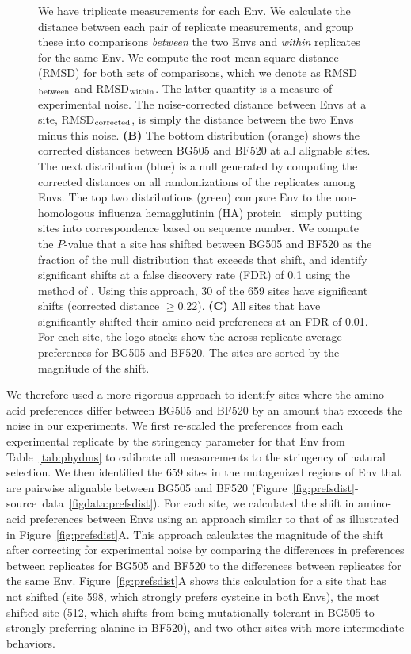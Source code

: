\documentclass[9pt]{elife}
\begin{document}
\begin{figure}
\begin{fullwidth}
{We have triplicate measurements for each Env.
We calculate the distance between each pair of replicate measurements, and group these into comparisons \emph{between} the two Envs and \emph{within} replicates for the same Env.
We compute the root-mean-square distance (RMSD) for both sets of comparisons, which we denote as RMSD$_{\rm{between}}$ and RMSD$_{\rm{within}}$.
The latter quantity is a measure of experimental noise.
The noise-corrected distance between Envs at a site, RMSD$_{\rm{corrected}}$, is simply the distance between the two Envs minus this noise.
{\bf (B)} The bottom distribution (orange) shows the corrected distances between BG505 and BF520 at all alignable sites.
The next distribution (blue) is a null generated by computing the corrected distances on all randomizations of the replicates among Envs.
The top two distributions (green) compare Env to the non-homologous influenza hemagglutinin (HA) protein~\citep{doud2016accurate} simply putting sites into correspondence based on sequence number.
We compute the $P$-value that a site has shifted between BG505 and BF520 as the fraction of the null distribution that exceeds that shift, and identify significant shifts at a false discovery rate (FDR) of 0.1 using the method of \citet{benjamini1995controlling}.
Using this approach, 30 of the 659 sites have significant shifts (corrected distance $\ge$0.22).
{\bf (C)} All sites that have significantly shifted their amino-acid preferences at an FDR of 0.01.
For each site, the logo stacks show the across-replicate average preferences for BG505 and BF520.
The sites are sorted by the magnitude of the shift.
}
\end{fullwidth}
\end{figure}

We therefore used a more rigorous approach to identify sites where the amino-acid preferences differ between BG505 and BF520 by an amount that exceeds the noise in our experiments.
We first re-scaled the preferences from each experimental replicate by the stringency parameter for that Env from Table~\ref{tab:phydms} to calibrate all measurements to the stringency of natural selection.
We then identified the 659 sites in the mutagenized regions of Env that are pairwise alignable between BG505 and BF520 (Figure~\ref{fig:prefsdist}-source~data~\ref{figdata:prefsdist}).
For each site, we calculated the shift in amino-acid preferences between Envs using an approach similar to that of \citet{doud2015site} as illustrated in Figure~\ref{fig:prefsdist}A.
This approach calculates the magnitude of the shift after correcting for experimental noise by comparing the differences in preferences between replicates for BG505 and BF520 to the differences between replicates for the same Env.
Figure~\ref{fig:prefsdist}A shows this calculation for a site that has not shifted (site 598, which strongly prefers cysteine in both Envs), the most shifted site (512, which shifts from being mutationally tolerant in BG505 to strongly preferring alanine in BF520), and two other sites with more intermediate behaviors.
\end{document}
